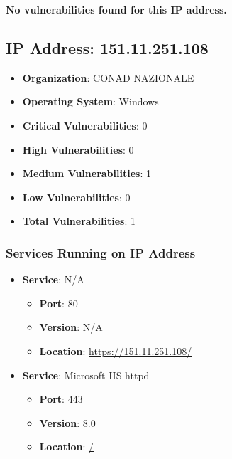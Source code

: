 \documentclass{article}
\begin{document}
\textbf{No vulnerabilities found for this IP address.}




\clearpage



\subsection*{IP Address: 151.11.251.108}

\begin{itemize}
    \item \textbf{Organization}: CONAD NAZIONALE
    \item \textbf{Operating System}:  Windows 
    \item \textbf{Critical Vulnerabilities}: 0
    \item \textbf{High Vulnerabilities}: 0
    \item \textbf{Medium Vulnerabilities}: 1
    \item \textbf{Low Vulnerabilities}: 0
    \item \textbf{Total Vulnerabilities}: 1
\end{itemize}

\subsubsection*{Services Running on IP Address}

\begin{itemize}
    
        \item \textbf{Service}: N/A
        \begin{itemize}
            \item \textbf{Port}: 80
            \item \textbf{Version}:  N/A 
            \item \textbf{Location}: \href{ https://151.11.251.108/ }{ https://151.11.251.108/ }
        \end{itemize}
    
        \item \textbf{Service}: Microsoft IIS httpd
        \begin{itemize}
            \item \textbf{Port}: 443
            \item \textbf{Version}:  8.0 
            \item \textbf{Location}: \href{ / }{ / }
        \end{itemize}
    
\end{itemize}
\end{document}
